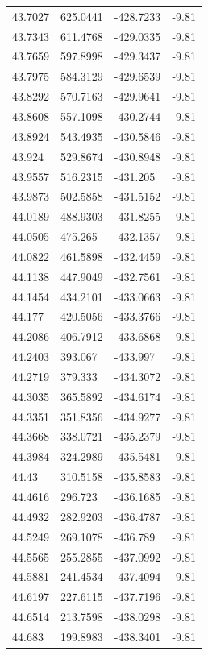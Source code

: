 \begin{table}[H]
\begin{tabular}{llll}
43.7027 & 625.0441 & -428.7233 & -9.81 \\
43.7343 & 611.4768 & -429.0335 & -9.81 \\
43.7659 & 597.8998 & -429.3437 & -9.81 \\
43.7975 & 584.3129 & -429.6539 & -9.81 \\
43.8292 & 570.7163 & -429.9641 & -9.81 \\
43.8608 & 557.1098 & -430.2744 & -9.81 \\
43.8924 & 543.4935 & -430.5846 & -9.81 \\
43.924 & 529.8674 & -430.8948 & -9.81 \\
43.9557 & 516.2315 & -431.205 & -9.81 \\
43.9873 & 502.5858 & -431.5152 & -9.81 \\
44.0189 & 488.9303 & -431.8255 & -9.81 \\
44.0505 & 475.265 & -432.1357 & -9.81 \\
44.0822 & 461.5898 & -432.4459 & -9.81 \\
44.1138 & 447.9049 & -432.7561 & -9.81 \\
44.1454 & 434.2101 & -433.0663 & -9.81 \\
44.177 & 420.5056 & -433.3766 & -9.81 \\
44.2086 & 406.7912 & -433.6868 & -9.81 \\
44.2403 & 393.067 & -433.997 & -9.81 \\
44.2719 & 379.333 & -434.3072 & -9.81 \\
44.3035 & 365.5892 & -434.6174 & -9.81 \\
44.3351 & 351.8356 & -434.9277 & -9.81 \\
44.3668 & 338.0721 & -435.2379 & -9.81 \\
44.3984 & 324.2989 & -435.5481 & -9.81 \\
44.43 & 310.5158 & -435.8583 & -9.81 \\
44.4616 & 296.723 & -436.1685 & -9.81 \\
44.4932 & 282.9203 & -436.4787 & -9.81 \\
44.5249 & 269.1078 & -436.789 & -9.81 \\
44.5565 & 255.2855 & -437.0992 & -9.81 \\
44.5881 & 241.4534 & -437.4094 & -9.81 \\
44.6197 & 227.6115 & -437.7196 & -9.81 \\
44.6514 & 213.7598 & -438.0298 & -9.81 \\
44.683 & 199.8983 & -438.3401 & -9.81 \\

\end{tabular}
\end{table}
